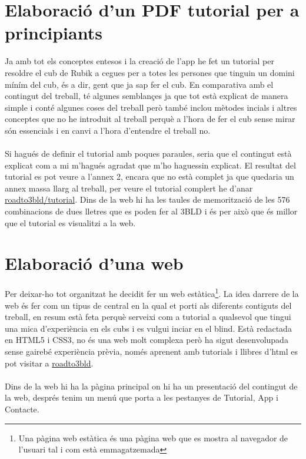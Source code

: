 \chapter{Elaboració d'un PDF tutorial per a principiants}

Ja amb tot els conceptes entesos i la creació de l'app he fet un tutorial per resoldre el cub de Rubik a cegues per a totes les persones que tinguin un domini míním del cub, és a dir, gent que ja sap fer el cub. 
En comparativa amb el contingut del treball, té algunes semblançes ja que tot està explicat de manera simple i conté algunes coses del treball però també inclou mètodes incials i altres conceptes que no he introduit al treball perquè a l'hora de fer el cub sense mirar són essencials i en canvi a l'hora d'entendre el treball no. \cite{Progressio} \cite{Cuber} \cite{EdgeSetup}
\\\\Si hagués de definir el tutorial amb poques paraules, seria que el contingut està explicat com a mi m'hagués agradat que m'ho haguessin explicat. El resultat del tutorial es pot veure a l'annex 2, encara que no està complet ja que quedaria un annex massa llarg al treball, per veure el tutorial complert he d'anar \href{https://polsances13.github.io/roadto3bld/Tutorial.html}{roadto3bld/tutorial}. Dins de la web hi ha les taules de memorització de les 576 combinacions de dues lletres que es poden fer al 3BLD i és per això que és millor que el tutorial es visualitzi a la web.




\chapter{Elaboració d'una web}

Per deixar-ho tot organitzat he decidit fer un web estàtica\footnote{Una pàgina web estàtica és una pàgina web que es mostra al navegador de l'usuari tal i com està emmagatzemada}. La idea darrere de la web és fer com un tipus de central en la qual et porti als diferents contiguts del treball, en resum està feta perquè serveixi com a tutorial a qualsevol que tingui una mica d'experiència en els cubs i es vulgui inciar en el blind.
Està redactada en HTML5 i CSS3, no és una web molt complexa però ha sigut desenvolupada sense gairebé experiència prèvia, només aprenent amb tutorials i llibres d'html es pot visitar a \href{https://polsances13.github.io/roadto3bld/index.html}{roadto3bld}.
\\\\Dins de la web hi ha la pàgina principal on hi ha un presentació del contingut de la web, després tenim un menú que porta a les pestanyes de Tutorial, App i Contacte. \cite{AjudaWeb}

